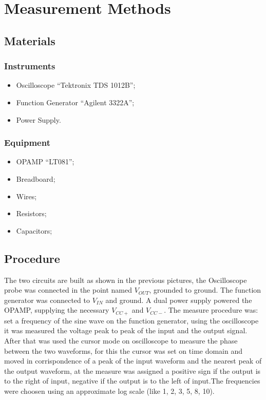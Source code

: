 \documentclass[a4paper,twocolumn]{article}
\begin{document}
\section{Measurement Methods}

\subsection{Materials}
\subsubsection{Instruments}
\begin{itemize}
    \item Oscilloscope ``Tektronix TDS 1012B'';
    \item Function Generator ``Agilent 3322A'';
    \item Power Supply.
\end{itemize}
\subsubsection{Equipment}
\begin{itemize}
    \item OPAMP ``LT081'';
    \item Breadboard;
    \item Wires;
    \item Resistors;
    \item Capacitors;
\end{itemize}
    \subsection{Procedure}

The two circuits are built as shown in the previous pictures, the Oscilloscope probe was connected in the point named \(V_{OUT}\), grounded to ground. The function generator was connected to \(V_{IN}\) and ground. A dual power supply powered the OPAMP, supplying the necessary \(V_{CC+}\) and \(V_{CC-}\). The measure procedure was: set a frequency of the sine wave on the function generator, using the oscilloscope it was measured the voltage peak to peak of the input and the output signal. After that was used the cursor mode on oscilloscope to measure the phase between the two waveforms, for this the cursor was set on time domain and moved in corrispondence of a peak of the input waveform and the nearest peak of the output waveform, at the measure was assigned a positive sign if the output is to the right of input, negative if the output is to the left of input.The frequencies were choosen using an approximate log scale (like 1, 2, 3, 5, 8, 10). 
\end{document}
